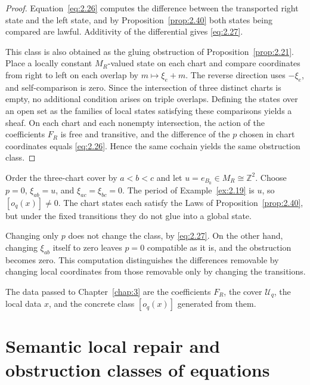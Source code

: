 \begin{proof}

Equation~\eqref{eq:2.26} computes the difference between the transported right state and
the left state, and by Proposition~\ref{prop:2.40} both states being compared are lawful.
Additivity of the differential gives \eqref{eq:2.27}.

This class is also obtained as the gluing obstruction of Proposition~\ref{prop:2.21}.
Place a locally constant $M_R$-valued state on each chart and compare coordinates from
right to left on each overlap by $m\mapsto\xi_e+m$. The reverse direction uses $-\xi_e$,
and self-comparison is zero. Since the intersection of three distinct charts is empty, no
additional condition arises on triple overlaps. Defining the states over an open set as
the families of local states satisfying these comparisons yields a sheaf. On each chart
and each nonempty intersection, the action of the coefficients $F_R$ is free and
transitive, and the difference of the $p$ chosen in chart coordinates equals
\eqref{eq:2.26}. Hence the same cochain yields the same obstruction class.

\end{proof}

\begin{example}\label{ex:2.42}

Order the three-chart cover by $a<b<c$ and let $u=e_{B_0}\in M_R\cong\mathbb{Z}^2$.
Choose $p=0$, $\xi_{ab}=u$, and $\xi_{ac}=\xi_{bc}=0$. The period of
Example~\ref{ex:2.19} is $u$, so $[o_q(x)]\ne0$. The chart states each satisfy the Laws of
Proposition~\ref{prop:2.40}, but under the fixed transitions they do not glue into a
global state.

Changing only $p$ does not change the class, by \eqref{eq:2.27}. On the other hand,
changing $\xi_{ab}$ itself to zero leaves $p=0$ compatible as it is, and the obstruction
becomes zero. This computation distinguishes the differences removable by changing local
coordinates from those removable only by changing the transitions.

The data passed to Chapter~\ref{chap:3} are the coefficients $F_R$, the cover
$\mathcal{U}_q$, the local data $x$, and the concrete class $[o_q(x)]$ generated from
them.

\end{example}

\section{Semantic local repair and obstruction classes of equations}\label{sec:2.9}

